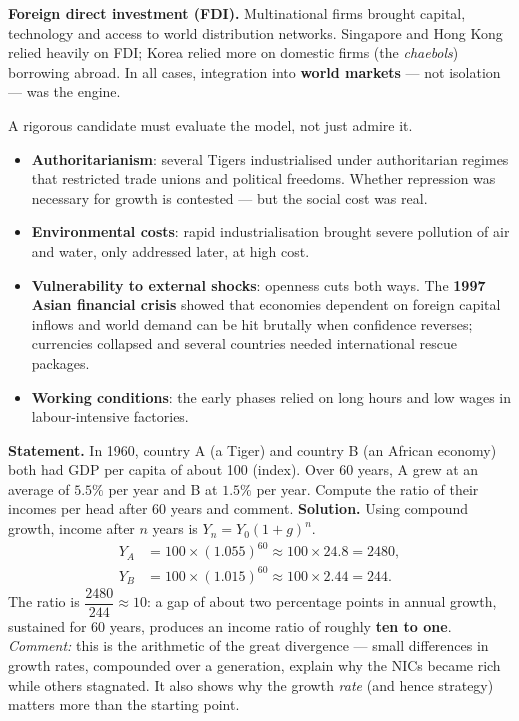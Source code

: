 \documentclass[11pt]{article}
\newcounter{popsec}
\newcounter{popsub}
\newcommand{\courssub}[1]{%
  \stepcounter{popsub}%
  \par\vspace{9pt}\noindent{\popxbold\fontsize{11.5}{13}\selectfont\color{popink}{\color{poporange}\thepopsec.\thepopsub}\hspace{6pt}#1}\par\nopagebreak\vspace{4pt}
}
\begin{document}
\textbf{Foreign direct investment (FDI).} Multinational firms brought capital, technology and access to world distribution networks. Singapore and Hong Kong relied heavily on FDI; Korea relied more on domestic firms (the \emph{chaebols}) borrowing abroad. In all cases, integration into \textbf{world markets} — not isolation — was the engine.

\courssub{Limits and Criticisms of the NIC Model}

A rigorous candidate must evaluate the model, not just admire it.

\begin{itemize}
\item \textbf{Authoritarianism}: several Tigers industrialised under authoritarian regimes that restricted trade unions and political freedoms. Whether repression was necessary for growth is contested — but the social cost was real.
\item \textbf{Environmental costs}: rapid industrialisation brought severe pollution of air and water, only addressed later, at high cost.
\item \textbf{Vulnerability to external shocks}: openness cuts both ways. The \textbf{1997 Asian financial crisis} showed that economies dependent on foreign capital inflows and world demand can be hit brutally when confidence reverses; currencies collapsed and several countries needed international rescue packages.
\item \textbf{Working conditions}: the early phases relied on long hours and low wages in labour-intensive factories.
\end{itemize}

\begin{exoresolu}
\textbf{Statement.} In 1960, country A (a Tiger) and country B (an African economy) both had GDP per capita of about 100 (index). Over 60 years, A grew at an average of $5.5\%$ per year and B at $1.5\%$ per year. Compute the ratio of their incomes per head after 60 years and comment.
\tcblower
\textbf{Solution.} Using compound growth, income after $n$ years is $Y_n = Y_0(1+g)^n$.
\begin{align*}
Y_A &= 100 \times (1.055)^{60} \approx 100 \times 24.8 = 2480,\\
Y_B &= 100 \times (1.015)^{60} \approx 100 \times 2.44 = 244.
\end{align*}
The ratio is $\dfrac{2480}{244} \approx 10$: a gap of about two percentage points in annual growth, sustained for 60 years, produces an income ratio of roughly \textbf{ten to one}. \emph{Comment:} this is the arithmetic of the great divergence — small differences in growth rates, compounded over a generation, explain why the NICs became rich while others stagnated. It also shows why the growth \emph{rate} (and hence strategy) matters more than the starting point.
\end{exoresolu}
\end{document}
